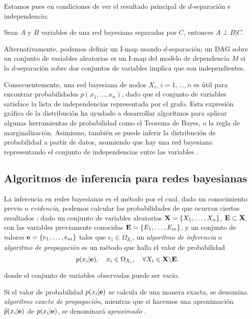 Estamos pues en condiciones de ver el resultado principal de $d$-separación e independencia:

\begin{teorema}
    Sean $A$ y $B$ variables de una red bayesiana separadas por $C$, entonces $A \perp B | C$.
\end{teorema}
    
Alternativamente, podemos definir un I-map usando $d$-separación: un DAG sobre un conjunto de variables 
aleatorias es un I-map del modelo de dependencia $M$ si la $d$-separación sobre dos conjuntos de variables 
implica que son independientes.
    
Consecuentemente, una red bayesiana de nodos $X_i$, $i = 1, \ldots , n$ es útil para encontrar probabilidades 
$p(x_1, \ldots, x_n)$, dado que el conjunto de variables satisface la lista de independencias representada por 
el grafo. Esta expresión gráfica de la distribución ha ayudado a desarrollar algoritmos para aplicar algunas 
herramientas de probabilidad como el Teorema de Bayes, o la regla de marginalización. Asimismo, también se 
puede inferir la 
distribución de probabilidad a partir de datos, asumiendo que hay una red bayesiana representando el conjunto 
de independencias entre las variables \cite{buntine}.
    
\subsection{Algoritmos de inferencia para redes bayesianas}
    
La inferencia en redes bayesianas es el método por el cual, dado un conocimiento previo o {\em evidencia}, 
podemos calcular las probabilidades de que ocurran ciertos resultados \cite{pearl88}; dado un conjunto de 
variables aleatorias ${\bf X} = \{X_1, \dots, X_n\}$, ${\bf E} \subset {\bf X}$, con las variables previamente 
conocidas ${\bf E} = \{E_1,\dots, E_m\}$, y un conjunto de valores ${\bf e} = \{e_1, \dots, e_m\}$ tales que 
$e_i \in \Omega_{E_i}$, un {\em algoritmo de inferencia} o {\em algoritmo de propagación} es un método que halla 
el valor de probabilidad 
$$p(x_i|{\bf e}), \quad x_i \in \Omega_{X_i}, \quad \forall X_i \in {\bf X} \backslash {\bf E}.$$

donde el conjunto de variables observadas puede ser vacío.

Si el valor de probabilidad $p(x_i|{\bf e})$ se calcula de una manera exacta, se denomina {\em algoritmo exacto 
de propagación}, mientras que si hacemos una aproximación $\widehat p(x_i|{\bf e})$ de $p(x_i|{\bf e})$, se 
denominará {\em aproximado} \cite{Cano2004}.

